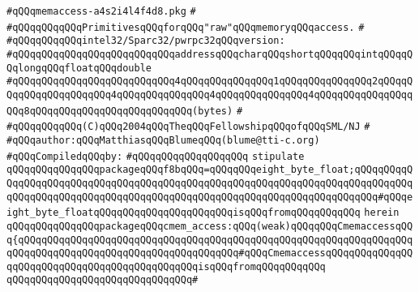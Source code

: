 \label{src/lib/c-glue-lib/ram/memaccess-a4s2i4l4f4d8.pkg}
\verb|#qQQqmemaccess-a4s2i4l4f4d8.pkg|\newline
\verb|#|\newline
\verb|#qQQqqQQqqQQqPrimitivesqQQqforqQQq"raw"qQQqmemoryqQQqaccess.|\newline
\verb|#|\newline
\verb|#qQQqqQQqqQQqintel32/Sparc32/pwrpc32qQQqversion:|\newline
\verb|#qQQqqQQqqQQqqQQqqQQqqQQqqQQqaddressqQQqcharqQQqshortqQQqqQQqintqQQqqQQqlongqQQqfloatqQQqdouble|\newline
\verb|#qQQqqQQqqQQqqQQqqQQqqQQqqQQq4qQQqqQQqqQQqqQQq1qQQqqQQqqQQqqQQq2qQQqqQQqqQQqqQQqqQQqqQQq4qQQqqQQqqQQqqQQq4qQQqqQQqqQQqqQQq4qQQqqQQqqQQqqQQqqQQq8qQQqqQQqqQQqqQQqqQQqqQQqqQQq(bytes)|\newline
\verb|#|\newline
\verb|#qQQqqQQqqQQq(C)qQQq2004qQQqTheqQQqFellowshipqQQqofqQQqSML/NJ|\newline
\verb|#|\newline
\verb|#qQQqauthor:qQQqMatthiasqQQqBlumeqQQq(blume@tti-c.org)|\newline
\newline
\verb|#qQQqCompiledqQQqby:|\newline
\verb|#qQQqqQQqqQQqqQQqqQQq|\newline
\newline
\verb|stipulate|\newline
\verb|qQQqqQQqqQQqqQQqpackageqQQqf8bqQQq=qQQqqQQqeight_byte_float;qQQqqQQqqQQqqQQqqQQqqQQqqQQqqQQqqQQqqQQqqQQqqQQqqQQqqQQqqQQqqQQqqQQqqQQqqQQqqQQqqQQqqQQqqQQqqQQqqQQqqQQqqQQqqQQqqQQqqQQqqQQqqQQqqQQqqQQqqQQqqQQq#qQQqeight_byte_floatqQQqqQQqqQQqqQQqqQQqqQQqisqQQqfromqQQqqQQqqQQq|\newline
\verb|herein|\newline
\newline
\verb|qQQqqQQqqQQqqQQqpackageqQQqcmem_access:qQQq(weak)qQQqqQQqCmemaccessqQQq{qQQqqQQqqQQqqQQqqQQqqQQqqQQqqQQqqQQqqQQqqQQqqQQqqQQqqQQqqQQqqQQqqQQqqQQqqQQqqQQqqQQqqQQqqQQqqQQqqQQqqQQqqQQq#qQQqCmemaccessqQQqqQQqqQQqqQQqqQQqqQQqqQQqqQQqqQQqqQQqqQQqqQQqisqQQqfromqQQqqQQqqQQq|\newline
\verb|qQQqqQQqqQQqqQQqqQQqqQQqqQQqqQQq#|\newline
